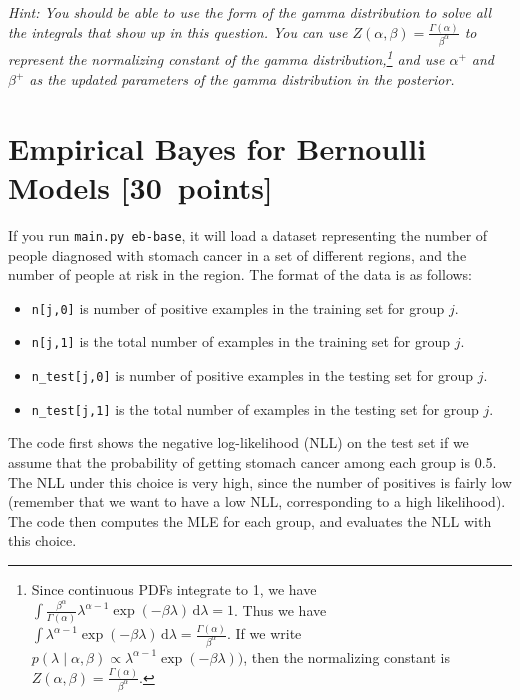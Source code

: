 \documentclass{article}
\newcommand{\pts}[1]{\textcolor{points}{[#1~points]}}
\newcommand{\hint}[1]{\textcolor{black!60!white}{\emph{Hint: #1}}}
\newcommand{\ud}{\,\mathrm{d}}
\begin{document}
\hint{You should be able to use the form of the gamma distribution to solve all the integrals that show up in this question. You can use $Z(\alpha, \beta) = \frac{\Gamma(\alpha)}{\beta^\alpha}$ to represent the normalizing constant of the gamma distribution,\footnote{%
    Since continuous PDFs integrate to 1, we have 
    $\int \frac{\beta^\alpha}{\Gamma(\alpha)} \lambda^{\alpha-1} \exp(-\beta\lambda) \ud\lambda = 1$. 
    Thus we have $\int \lambda^{\alpha-1} \exp(-\beta\lambda) \ud\lambda = \frac{\Gamma(\alpha)}{\beta^\alpha}$.
    If we write $p(\lambda \mid \alpha, \beta) \propto \lambda^{\alpha-1} \exp(-\beta\lambda))$,
    then the normalizing constant is $Z(\alpha,\beta) = \frac{\Gamma(\alpha)}{\beta^\alpha}$.
} and use $\alpha^+$ and $\beta^+$ as the updated parameters of the gamma distribution in the posterior.}


\clearpage
\section{Empirical Bayes for Bernoulli Models \pts{30}}

If you run \texttt{main.py eb-base}, it will load a dataset representing the number of people diagnosed with stomach cancer in a set of different regions, and the number of people at risk in the region. The format of the data is as follows:
\begin{itemize}
  \item \texttt{n[j,0]} is number of positive examples in the training set for group $j$.
  \item \texttt{n[j,1]} is the total number of examples in the training set for group $j$.
  \item \texttt{n\_test[j,0]} is number of positive examples in the testing set for group $j$.
  \item \texttt{n\_test[j,1]} is the total number of examples in the testing set for group $j$.
\end{itemize}
The code first shows the negative log-likelihood (NLL) on the test set if we assume that the probability of getting stomach cancer among each group is 0.5. The NLL under this choice is very high, since the number of positives is fairly low (remember that we want to have a low NLL, corresponding to a high likelihood). The code then computes the MLE for each group, and evaluates the NLL with this choice.
\end{document}
